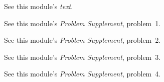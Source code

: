 {\BriefAns

\begin{one-digit-list}
\item [1.] See this module's \textit{text}.
\item [2.] See this module's \textit{Problem Supplement}, problem~1.
\item [3.] See this module's \textit{Problem Supplement}, problem~2.
\item [4.] See this module's \textit{Problem Supplement}, problem~3.
\item [5.] See this module's \textit{Problem Supplement}, problem~4.
\end{one-digit-list}

}%
